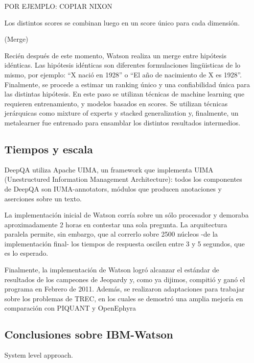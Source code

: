 POR EJEMPLO: COPIAR NIXON

Los distintos scores se combinan luego en un score único para cada
dimensión.

(Merge)

Recién después de este momento, Watson realiza un merge entre
hipótesis idénticas. Las hipótesis idénticas son diferentes
formulaciones ling\"uisticas de lo mismo, por ejemplo:
{\textquotedblleft}X nació en 1928{\textquotedblright} o
{\textquotedblleft}El año de nacimiento de X es
1928{\textquotedblright}. Finalmente, se procede a estimar un ranking
único y una confiabilidad única para las distintas hipótesis. En
este paso se utilizan técnicas de machine learning que requieren
entrenamiento, y modelos basados en scores. Se utilizan técnicas
jerárquicas como mixture of experts y stacked generalization y,
finalmente, un metalearner fue entrenado para ensamblar los distintos
resultados intermedios. 


\bigskip

\subsection{Tiempos y escala}

DeepQA utiliza Apache UIMA, un framework que implementa UIMA
(Unestructured Information Management Architecture): todos los
componentes de DeepQA son IUMA-annotators, módulos que producen
anotaciones y aserciones sobre un texto.

La implementación inicial de Watson corría sobre un sólo
procesador y demoraba aproximadamente 2 horas en contestar una sola
pregunta. La arquitectura paralela permite, sin embargo, que al
correrlo sobre 2500 núcleos -de la implementación final- los
tiempos de respuesta oscilen entre 3 y 5 segundos, que es lo esperado.

Finalmente, la implementación de Watson logró alcanzar el estándar
de resultados de los campeones de Jeopardy y, como ya dijimos,
compitió y ganó el programa en Febrero de 2011. Además, se
realizaron adaptaciones para trabajar sobre los problemas de TREC, en
los cuales se demostró una amplia mejoría en comparación con
PIQUANT y OpenEphyra


\bigskip

\subsection{Conclusiones sobre IBM-Watson}

System level approach.


